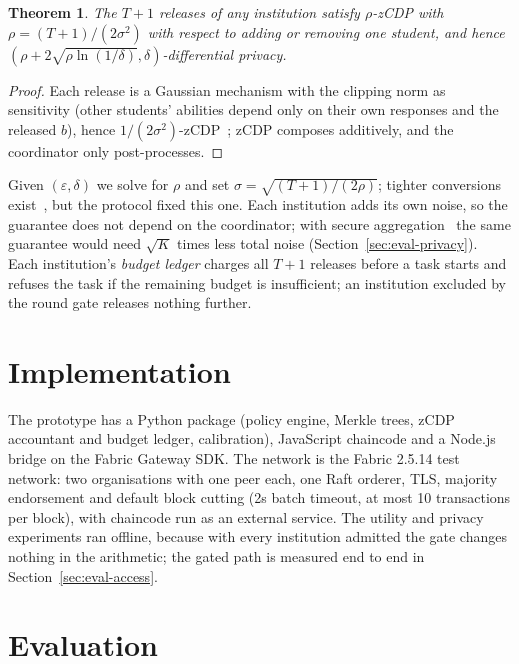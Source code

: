 \documentclass[pdflatex,iicol,sn-mathphys-num]{sn-jnl}
\theoremstyle{thmstyleone}
\newtheorem{theorem}{Theorem}
\newcommand{\FabricBatchTimeout}{2s}
\newcommand{\FabricMaxMsg}{10}
\newcommand{\FabricVersion}{2.5.14}
\begin{document}
\begin{theorem}\label{thm:dp}
The $T+1$ releases of any institution satisfy $\rho$-zCDP with $\rho=(T+1)/(2\sigma^2)$ with respect to adding or removing one student, and hence $(\rho+2\sqrt{\rho\ln(1/\delta)},\delta)$-differential privacy.
\end{theorem}
\begin{proof}
Each release is a Gaussian mechanism with the clipping norm as sensitivity (other students' abilities depend only on their own responses and the released $b$), hence $1/(2\sigma^2)$-zCDP~\cite{bun2016concentrated}; zCDP composes additively, and the coordinator only post-processes.
\end{proof}

Given $(\varepsilon,\delta)$ we solve for $\rho$ and set $\sigma=\sqrt{(T+1)/(2\rho)}$; tighter conversions exist~\cite{canonne2020discrete}, but the protocol fixed this one. Each institution adds its own noise, so the guarantee does not depend on the coordinator; with secure aggregation~\cite{bonawitz2017practical} the same guarantee would need $\sqrt{K}$ times less total noise (Section~\ref{sec:eval-privacy}). Each institution's \emph{budget ledger} charges all $T+1$ releases before a task starts and refuses the task if the remaining budget is insufficient; an institution excluded by the round gate releases nothing further.

\section{Implementation}\label{sec:impl}

The prototype has a Python package (policy engine, Merkle trees, zCDP accountant and budget ledger, calibration), JavaScript chaincode and a Node.js bridge on the Fabric Gateway SDK. The network is the Fabric \FabricVersion{} test network: two organisations with one peer each, one Raft orderer, TLS, majority endorsement and default block cutting (\FabricBatchTimeout{} batch timeout, at most \FabricMaxMsg{} transactions per block), with chaincode run as an external service. The utility and privacy experiments ran offline, because with every institution admitted the gate changes nothing in the arithmetic; the gated path is measured end to end in Section~\ref{sec:eval-access}.

\section{Evaluation}\label{sec:eval}
\end{document}
